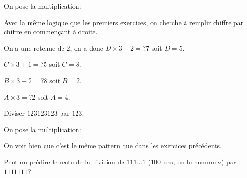 \documentclass[fleqn,a4paper,nobib]{tufte-handout}
\begin{document}
\begin{solution}

    On pose la multiplication:
    

    Avec la même logique que les premiers exercices,
    on cherche à remplir chiffre par chiffre en
    commençant à droite.
    

    On a une retenue de $2$, on a donc $D\times3+2=?7$
    soit $D = 5$.
    

    $C\times3+1=?5$ soit $C = 8$.

    
    $B\times3+2=?8$ soit $B=2$.
    
    $A\times3=?2$ soit $A=4$. 

\end{solution}
    
    
    


\begin{exercise}
    Diviser $123123123$ par $123$.
\end{exercise}

\begin{solution}
    On pose la multiplication:


    On voit bien que c'est le même pattern que dans les
    exercices précédents.



\end{solution}







\begin{exercise}
    Peut-on prédire le reste de la division de
    $111...1$ (100 uns, on le nomme $a$) par $1111111$?
\end{exercise}
\end{document}
